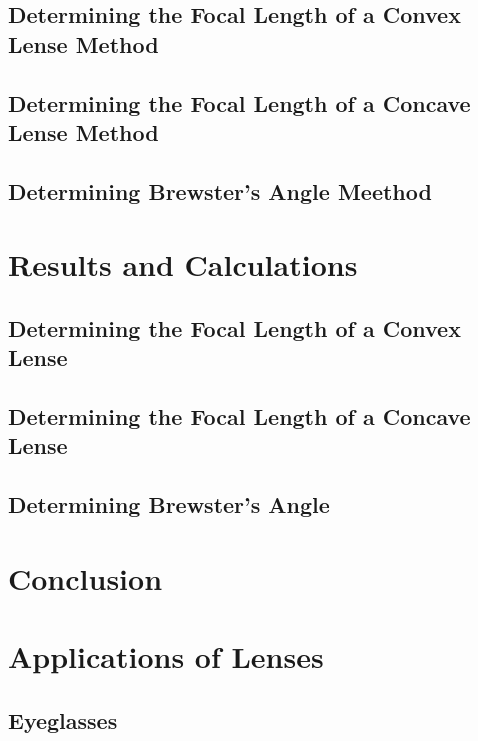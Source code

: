 \documentclass[12pt]{article}
\begin{document}
\subsection{Determining the Focal Length of a Convex Lense Method}



\subsection{Determining the Focal Length of a Concave Lense Method}



\subsection{Determining Brewster's Angle Meethod}



\section{Results and Calculations}

\subsection{Determining the Focal Length of a Convex Lense}



\subsection{Determining the Focal Length of a Concave Lense}



\subsection{Determining Brewster's Angle}



\section{Conclusion} \label{sec:4}


\section{Applications of Lenses}

\subsection{Eyeglasses}
\end{document}
